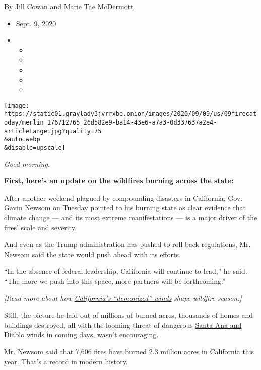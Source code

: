 By \href{https://www.nytimes3xbfgragh.onion/by/jill-cowan}{Jill Cowan}
and
\href{https://www.nytimes3xbfgragh.onion/by/marie-tae-mcdermott}{Marie
Tae McDermott}

\begin{itemize}
\item
  Sept. 9, 2020
\item
  \begin{itemize}
  \item
  \item
  \item
  \item
  \item
  \end{itemize}
\end{itemize}

\texttt{[image: https://static01.graylady3jvrrxbe.onion/images/2020/09/09/us/09firecatoday/merlin\_176712765\_26d582e9-ba14-43e6-a7a3-0d337637a2e4-articleLarge.jpg?quality=75\\\&auto=webp\\\&disable=upscale]}

\emph{Good morning.}

\textbf{First, here's an update on the wildfires burning across the
state:}

After another weekend plagued by compounding disasters in California,
Gov. Gavin Newsom on Tuesday pointed to his burning state as clear
evidence that climate change --- and its most extreme manifestations ---
is a major driver of the fires' scale and severity.

And even as the Trump administration has pushed to roll back
regulations, Mr. Newsom said the state would push ahead with its
efforts.

``In the absence of federal leadership, California will continue to
lead,'' he said. ``The more we push into this space, more partners will
be forthcoming.''

\emph{{[}Read more about how}
\href{https://www.nytimes3xbfgragh.onion/2019/10/14/us/santa-ana-winds-diablo-saddleridge-fire-blackouts.html}{\emph{California's
``demonized'' winds}} \emph{shape wildfire season.{]}}

Still, the picture he laid out of millions of burned acres, thousands of
homes and buildings destroyed, all with the looming threat of dangerous
\href{https://www.nytimes3xbfgragh.onion/2019/10/14/us/santa-ana-winds-diablo-saddleridge-fire-blackouts.html}{Santa
Ana and Diablo winds} in coming days, wasn't encouraging.

Mr. Newsom said that 7,606
\href{https://www.nytimes3xbfgragh.onion/2020/09/09/us/fires-washington-california-oregon-malden.html}{fires}
have burned 2.3 million acres in California this year. That's a record
in modern history.

